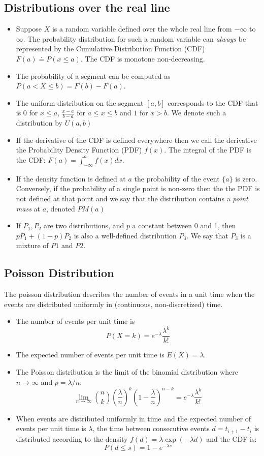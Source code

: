 \documentclass[10pt,twocolumn]{article}
\begin{document}
\subsection*{Distributions over the real line}
\begin{itemize}
\item
Suppose $X$ is a random variable defined over the whole real line from
$-\infty$ to $\infty$. The probability distribution for such a random
variable can {\em always} be represented by the Cumulative
Distribution Function (CDF) $F(a) \doteq P(x\leq a)$. The CDF is
monotone non-decreasing.
\item The probability of a segment can be computed as $P(a < X \leq
  b) = F(b)-F(a)$.
\item The uniform distribution on the segment $[a,b]$ corresponds to
  the CDF that is 0 for $x \leq a$, $\frac{x-a}{b-a}$ for $a\leq x
  \leq b$ and $1$ for $x>b$. We denote such a distribution by $U(a,b)$
\item If the derivative of the CDF is defined everywhere then we call
  the derivative the Probability Density Function (PDF) $f(x)$. The
  integral of the PDF is the CDF: $F(a) = \int_{-\infty}^a f(x) dx$.
\item If the density function is defined at $a$ the probability of the
  event $\{a\}$ is zero. Conversely, if the probability of a single
  point is non-zero then the the PDF is not defined at that point and
  we say that the distribution contains a {\em point mass} at $a$,
  denoted $PM(a)$
\item If $P_1,P_2$ are two distributions, and $p$ a constant between 0
  and 1, then $p P_1+(1-p)P_2$ is also a well-defined distribution
  $P_3$. We say that $P_3$ is a mixture of $P1$ and $P2$.
\end{itemize}
\subsection*{Poisson Distribution}
The poisson distribution describes the number of events in a unit time
when the events are distributed uniformly in (continuous, non-discretized) time.
\begin{itemize}
\item The number of events per unit time is 
\[
P(X=k)=e^{-\lambda} \frac{\lambda^k}{k!}
\]
\item The expected number of events per unit time is $E(X)=\lambda$.
\item The Poisson distribution is the limit of the binomial
  distribution where $n \to \infty$ and $p=\lambda/n$:
\[
\lim_{n \to \infty} {n \choose k} 
\left( \frac{\lambda}{n}\right)^k 
\left( 1 - \frac{\lambda}{n}\right)^{n-k} = e^{-\lambda} \frac{\lambda^k}{k!}
\]
\item When events are distributed uniformly in time and the expected
  number of events per unit time is $\lambda$, the time between
  consecutive events $d=t_{i+1}-t_{i}$ is distributed according to the density
  $f(d)=\lambda \exp(-\lambda d)$ and the CDF is:
\[
P(d \leq s)=1-e^{-\lambda s}
\]
\end{itemize}
\end{document}
